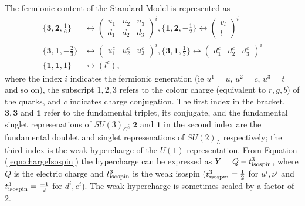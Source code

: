 \documentclass{article}
\begin{document}
The fermionic content of the Standard Model is represented as
\begin{equation}
\begin{split}
\{\bm{3},\bm{2},\frac{1}{6}\} &\leftrightarrow \left( 
\begin{matrix}
u_1 & u_2 & u_3 \\
d_1 & d_2 & d_3
\end{matrix}
\right)^i,  \{\bm{1},\bm{2},-\frac{1}{2}\} \leftrightarrow \left( 
\begin{matrix}
v_l \\
l
\end{matrix}\right)^i \\
\{ \overline{\bm{3}},\bm{1},-\frac{2}{3} \}&\leftrightarrow \left(
\begin{matrix}
u^{c}_1 & u^{c}_{2} & u^{c}_{3}
\end{matrix}\right)^i, \{ \overline{\bm{3}}, \bm{1}, \frac{1}{3} \}\leftrightarrow \left(
\begin{matrix}
d^{c}_1 & d^{c}_2 & d^{c}_3 
\end{matrix}\right)^i \\
\{ \bm{1}, \bm{1}, 1 \} &\leftrightarrow (l^c),
\end{split}
\end{equation}
where the index $i$ indicates the fermionic generation (ie $u^1 = u$, $u^2 = c$, $u^3 = t$ and so on), the subscript $1,2,3$ refers to the colour charge (equivalent to $r,g,b$) of the quarks, and $c$ indicates charge conjugation. The first index in the bracket, $\bm{3},\overline{\bm{3}}$ and $\bm{1}$ refer to the fundamental triplet, its conjugate, and the fundamental singlet represenations of $SU(3)_C$; $\bm{2}$ and $\bm{1}$ in the second index are the fundamental doublet and singlet represenations of $SU(2)_L$ respectively; the third index is the weak hypercharge of the $U(1)$ representation. From Equation (\ref{eqn:chargeIsospin}) the hypercharge can be expressed as $Y = Q - t^{3}_{\rm{isospin}}$, where $Q$ is the electric charge and $t^{3}_{\rm{isospin}}$ is the weak isospin ($t^{3}_{\rm{isospin}} = \frac{1}{2}$ for $u^i, \nu^i$ and $t^{3}_{\rm{isospin}} = \frac{-1}{2}$ for $d^i , e^i$). The weak hypercharge is sometimes scaled by a factor of 2.
\end{document}

